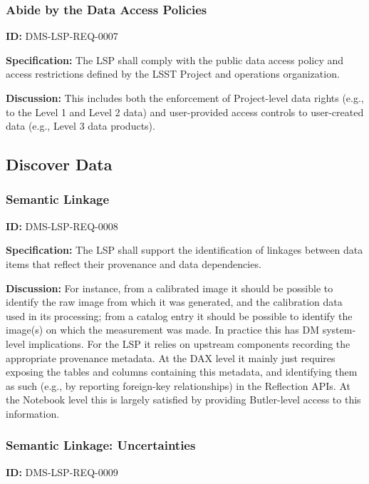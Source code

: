 \documentclass[SE,toc]{lsstdoc}
\begin{document}
\subsubsection{Abide by the Data Access Policies}

\label{DMS-LSP-REQ-0007}
\textbf{ID:} DMS-LSP-REQ-0007

\textbf{Specification:}
The LSP shall comply with the public data access policy and access restrictions defined by the LSST Project and operations organization.

\textbf{Discussion:}
This includes both the enforcement of Project-level data rights (e.g., to the Level 1 and Level 2 data) and user-provided access controls to user-created data (e.g., Level 3 data products).

\subsection{Discover Data}

\subsubsection{Semantic Linkage}

\label{DMS-LSP-REQ-0008}
\textbf{ID:} DMS-LSP-REQ-0008

\textbf{Specification:}
The LSP shall support the identification of linkages between data items that reflect their provenance and data dependencies.

\textbf{Discussion:}
For instance, from a calibrated image it should be possible to identify the raw image from which it was generated, and the calibration data used in its processing; from a catalog entry it should be possible to identify the image(s) on which the measurement was made.
In practice this has DM system-level implications.  For the LSP it relies on upstream components recording the appropriate provenance metadata.  At the DAX level it mainly just requires exposing the tables and columns containing this metadata, and identifying them as such (e.g., by reporting foreign-key relationships) in the Reflection APIs.  At the Notebook level this is largely satisfied by providing Butler-level access to this information.

\subsubsection{Semantic Linkage: Uncertainties}

\label{DMS-LSP-REQ-0009}
\textbf{ID:} DMS-LSP-REQ-0009
\end{document}

